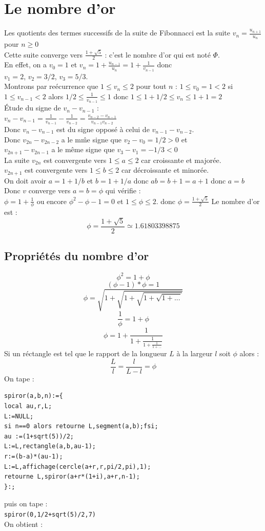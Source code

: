 \documentclass[a4paper,11pt]{book}
\begin{document}
\section{Le nombre d'or}
Les quotients des termes successifs de la suite de Fibonnacci est la suite 
$v_n=\frac{u_{n+1}}{u_n}$  pour $n \geq 0$\\
Cette suite converge vers  
$\frac{1+\sqrt 5}{2}$ : c'est le nombre d'or  qui est not\'e $\Phi$.\\
En effet, on a $v_0=1$ et $v_n=1+\frac{u_{n-1}}{u_n}=1+\frac{1}{v_{n-1}}$ donc \\
$v_1=2$, $v_2=3/2$, $v_3=5/3$.\\
Montrons par re\'ecurrence que $1 \leq v_n \leq 2$ pour tout $n$ :
$1\leq v_0=1<2$
si $1 \leq v_{n-1}<2$ alors $1/2\leq \frac{1}{v_{n-1}}\leq 1$
donc $1\leq 1+1/2 \leq v_n\leq 1+1=2$\\
\'Etude du signe de $v_n-v_{n-1}$ :\\
$v_n-v_{n-1}=\frac{1}{v_{n-1}}-\frac{1}{v_{n-2}}=\frac{v_{n-2}-v_{n-1}}{v_{n-1}v_{n-2}}$\\
Donc $v_n-v_{n-1}$ est du signe oppos\'e \`a celui de $v_{n-1}-v_{n-2}$.\\
Donc $v_{2n}-v_{2n-2}$ a le m\^me signe que $v_2-v_0=1/2>0$ et\\
$v_{2n+1}-v_{2n-1}$ a le m\^eme signe que $v_3-v_1=-1/3<0$\\
La suite $v_{2n}$ est convergente vers $1\leq a\leq 2$ car croissante et 
major\'ee.\\
$v_{2n+1}$ est convergente vers $1\leq b\leq 2$ car d\'ecroissante et 
minor\'ee.\\
On doit avoir $a=1+1/b$ et $b=1+1/a$ donc $ab=b+1=a+1$ donc $a=b$
Donc $v$ converge vers $a=b=\phi$ qui v\'erifie :\\
$\phi=1+\frac{1}{\phi}$ ou encore $\phi^2-\phi-1=0$ et $1\leq \phi \leq 2$.
donc $\phi=\frac{1+\sqrt 5}{2}$
Le nombre d'or est :
$$\phi=\frac{1+\sqrt 5}{2}\simeq 1.61803398875$$
\subsection{Propri\'et\'es du  nombre d'or}
$$\phi^2=1+\phi$$
$$(\phi-1)*\phi=1$$
$$\phi=\sqrt{1+\sqrt{1+\sqrt{1+\sqrt{1+...}}}}$$ 
$$ \frac{1}{\phi}=1+\phi$$
$$ \phi=1+\frac{1}{1+\displaystyle\frac{1}{1+\displaystyle\frac{1}{1+...}}}$$
Si un r\'ectangle est tel que le rapport de la longueur $L$ \`a la largeur $l$ 
soit $\phi$ alors :
$$\frac{L}{l}=\frac{l}{L-l}=\phi$$
On tape :
\begin{verbatim}
spiror(a,b,n):={
local au,r,L;
L:=NULL;
si n==0 alors retourne L,segment(a,b);fsi;
au :=(1+sqrt(5))/2;
L:=L,rectangle(a,b,au-1);
r:=(b-a)*(au-1);
L:=L,affichage(cercle(a+r,r,pi/2,pi),1);
retourne L,spiror(a+r*(1+i),a+r,n-1);
}:;
\end{verbatim}
puis on tape :\\
{\tt spiror(0,1/2+sqrt(5)/2,7)}\\
On obtient :\\
\end{document}
